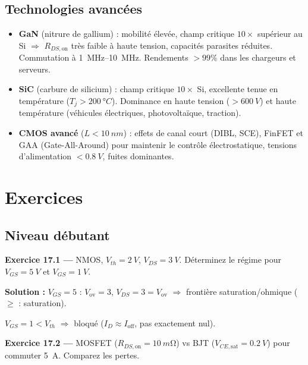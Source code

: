 \documentclass[12pt,a4paper,twoside]{book}
\begin{document}
\subsection{Technologies avancées}

\begin{pratique}
\begin{itemize}[nosep]
\item \textbf{GaN} (nitrure de gallium) : mobilité élevée, champ critique $10\times$ supérieur au Si $\Rightarrow$ $R_{DS,\text{on}}$ très faible à haute tension, capacités parasites réduites. Commutation à \SI{1}{MHz}--\SI{10}{MHz}. Rendements $> 99\%$ dans les chargeurs et serveurs.
\item \textbf{SiC} (carbure de silicium) : champ critique $10\times$ Si, excellente tenue en température ($T_j > \SI{200}{°C}$). Dominance en haute tension ($> \SI{600}{V}$) et haute température (véhicules électriques, photovoltaïque, traction).
\item \textbf{CMOS avancé} ($L < \SI{10}{nm}$) : effets de canal court (DIBL, SCE), FinFET et GAA (Gate-All-Around) pour maintenir le contrôle électrostatique, tensions d'alimentation $< \SI{0.8}{V}$, fuites dominantes.
\end{itemize}
\end{pratique}

\section*{Exercices}

\subsection*{Niveau débutant}

\textbf{Exercice 17.1 ---} NMOS, $V_{th} = \SI{2}{V}$, $V_{DS} = \SI{3}{V}$. Déterminez le régime pour $V_{GS} = \SI{5}{V}$ et $V_{GS} = \SI{1}{V}$.

\begin{pratique}
\textbf{Solution :} $V_{GS} = 5$ : $V_{\text{ov}} = 3$, $V_{DS} = 3 = V_{\text{ov}}$ $\Rightarrow$ frontière saturation/ohmique ($\geq$ : saturation).

$V_{GS} = 1 < V_{th}$ $\Rightarrow$ bloqué ($I_D \approx I_{\text{off}}$, pas exactement nul).
\end{pratique}

\textbf{Exercice 17.2 ---} MOSFET ($R_{DS,\text{on}} = \SI{10}{m\ohm}$) vs BJT ($V_{CE,\text{sat}} = \SI{0.2}{V}$) pour commuter \SI{5}{A}. Comparez les pertes.
\end{document}

